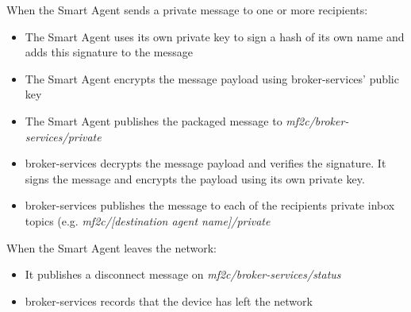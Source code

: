\documentclass{article}
\begin{document}
When the Smart Agent sends a private message to one or more recipients:
\begin{itemize}
    \item The Smart Agent uses its own private key to sign a hash of its own name and adds this signature to the message
    \item The Smart Agent encrypts the message payload using broker-services' public key
    \item The Smart Agent publishes the packaged message to \textit{mf2c/broker-services/private}
    \item broker-services decrypts the message payload and verifies the signature. It signs the message and encrypts the payload using its own private key.
    \item broker-services publishes the message to each of the recipients private inbox topics (e.g. \textit{mf2c/[destination agent name]/private}
\end{itemize}


When the Smart Agent leaves the network:
\begin{itemize}
    \item It publishes a disconnect message on \textit{mf2c/broker-services/status}
    \item broker-services records that the device has left the network
\end{itemize}
\end{document}
